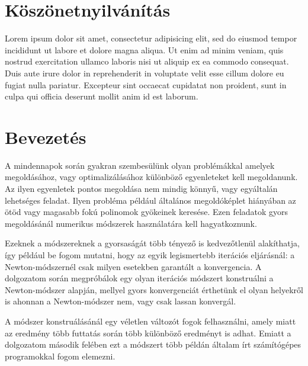 \documentclass[a4paper,12pt]{report}
\newcommand{\todoor}[1]{\todo[color=orange!90, size=\footnotesize]{#1}}
\begin{document}

%
%


	\chapter*{Köszönetnyilvánítás}
		Lorem ipsum dolor sit amet, consectetur adipisicing elit, sed do eiusmod tempor incididunt ut labore et dolore magna aliqua. Ut enim ad minim veniam, quis nostrud exercitation ullamco laboris nisi ut aliquip ex ea commodo consequat. Duis aute irure dolor in reprehenderit in voluptate velit esse cillum dolore eu fugiat nulla pariatur. Excepteur sint occaecat cupidatat non proident, sunt in culpa qui officia deserunt mollit anim id est laborum.



%
%

	\chapter{Bevezetés}
		\todoor{2013.05.14: megírtam a bevezetést}A mindennapok során gyakran szembesülünk olyan problémákkal amelyek megoldásához, vagy optimalizálásához különböző egyenleteket kell megoldanunk. Az ilyen egyenletek pontos megoldása nem mindig könnyű, vagy egyáltalán lehetséges feladat. Ilyen probléma például általános megoldóképlet hiányában az ötöd vagy magasabb fokú polinomok gyökeinek keresése. Ezen feladatok gyors megoldásánál numerikus módszerek használatára kell hagyatkoznunk.

		Ezeknek a módszereknek a gyorsaságát több tényező is kedvezőtlenül alakíthatja, így például be fogom mutatni, hogy az egyik legismertebb iterációs eljárásnál: a Newton-módszernél csak milyen esetekben garantált a konvergencia.  A dolgozatom során megpróbálok egy olyan iterációs módszert konstruálni a Newton-módszer alapján, mellyel gyors konvergenciát érthetünk el olyan helyekről is ahonnan a Newton-módszer nem, vagy csak lassan konvergál.

		A módszer konstruálásánál egy véletlen változót fogok felhasználni, amely miatt az eredmény több futtatás során több különböző eredményt is adhat. Emiatt a dolgozatom második felében ezt a módszert több példán általam írt számítógépes programokkal fogom elemezni.
\end{document}
